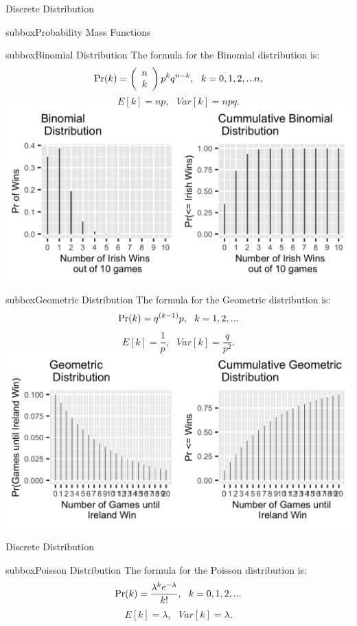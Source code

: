 \documentclass[10pt,a4paper]{article}
\def\Pr{\mathop{\rm Pr}}
\begin{document}
\begin{multicols}{3}
\begin{textbox}{Discrete Distribution}
\begin{subbox}{subbox}{Probability Mass Functions}
\end{subbox}

\begin{subbox}{subbox}{Binomial Distribution}
\tiny
The formula for the Binomial distribution is:
\[\Pr(k)= \left( \begin{array}{c}
	n  \\
	k  \\
	\end{array} \right)p^kq^{n-k}, \ \ k=0,1,2,...n, \]
	\[E[k]=np,\ \ \ Var[k]=npq.\]
    \includegraphics[width=\textwidth]{Figures/Distributions/Binomial.png}
\end{subbox}

\begin{subbox}{subbox}{Geometric Distribution}
\tiny
The formula for the Geometric distribution is:
\[\Pr(k)=q^{(k-1)}p, \ \ k=1,2,... \]
	\[E[k]=\frac{1}{p}, \ \ \ Var[k]=\frac{q}{p^2}.\]
    \includegraphics[width=\textwidth]{Figures/Distributions/Geometric.png}
\end{subbox}
\end{textbox}
\begin{textbox}{Discrete Distribution}

\begin{subbox}{subbox}{Poisson Distribution}
	\tiny
	The formula for the Poisson distribution is:
	\[\Pr(k)=\frac{\lambda^ke^{-\lambda}}{k!}, \ \ k=0,1,2,... \]
	\[E[k]=\lambda, \ \ \ Var[k]=\lambda. \]


\end{subbox}
\end{textbox}
\end{multicols}
\end{document}
